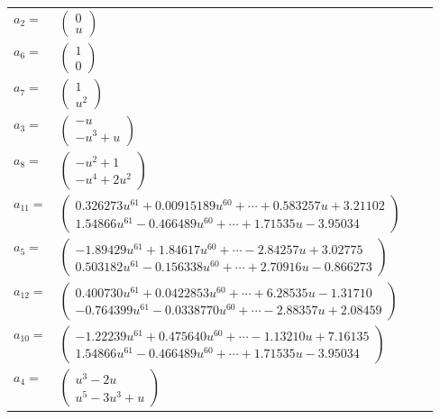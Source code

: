 \documentclass[1p]{elsarticle_modified}
\theoremstyle{definition}
\begin{document}
\begin{tabular}{m{7pt} m{180pt} m{7pt} m{180pt} }
\flushright $a_{2}=$&$\begin{pmatrix}0\\u\end{pmatrix}$ \\
\flushright $a_{6}=$&$\begin{pmatrix}1\\0\end{pmatrix}$ \\
\flushright $a_{7}=$&$\begin{pmatrix}1\\u^2\end{pmatrix}$ \\
\flushright $a_{3}=$&$\begin{pmatrix}- u\\- u^3+u\end{pmatrix}$ \\
\flushright $a_{8}=$&$\begin{pmatrix}- u^2+1\\- u^4+2 u^2\end{pmatrix}$ \\
\flushright $a_{11}=$&$\begin{pmatrix}0.326273 u^{61}+0.00915189 u^{60}+\cdots+0.583257 u+3.21102\\1.54866 u^{61}-0.466489 u^{60}+\cdots+1.71535 u-3.95034\end{pmatrix}$ \\
\flushright $a_{5}=$&$\begin{pmatrix}-1.89429 u^{61}+1.84617 u^{60}+\cdots-2.84257 u+3.02775\\0.503182 u^{61}-0.156338 u^{60}+\cdots+2.70916 u-0.866273\end{pmatrix}$ \\
\flushright $a_{12}=$&$\begin{pmatrix}0.400730 u^{61}+0.0422853 u^{60}+\cdots+6.28535 u-1.31710\\-0.764399 u^{61}-0.0338770 u^{60}+\cdots-2.88357 u+2.08459\end{pmatrix}$ \\
\flushright $a_{10}=$&$\begin{pmatrix}-1.22239 u^{61}+0.475640 u^{60}+\cdots-1.13210 u+7.16135\\1.54866 u^{61}-0.466489 u^{60}+\cdots+1.71535 u-3.95034\end{pmatrix}$ \\
\flushright $a_{4}=$&$\begin{pmatrix}u^3-2 u\\u^5-3 u^3+u\end{pmatrix}$ \\

\end{tabular}
\end{document}
